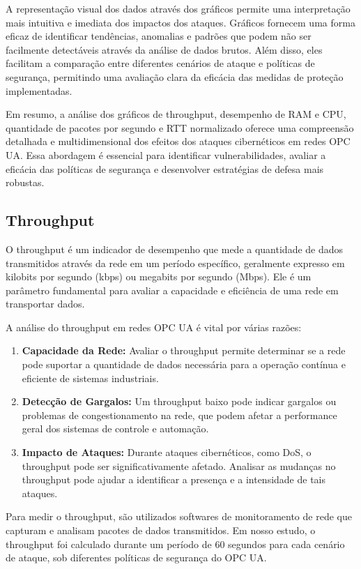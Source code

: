 {{    A representação visual dos dados através dos gráficos permite uma interpretação mais intuitiva e imediata dos impactos dos ataques. Gráficos fornecem uma forma eficaz de identificar tendências, anomalias e padrões que podem não ser facilmente detectáveis através da análise de dados brutos. Além disso, eles facilitam a comparação entre diferentes cenários de ataque e políticas de segurança, permitindo uma avaliação clara da eficácia das medidas de proteção implementadas.

    Em resumo, a análise dos gráficos de throughput, desempenho de RAM e CPU, quantidade de pacotes por segundo e RTT normalizado oferece uma compreensão detalhada e multidimensional dos efeitos dos ataques cibernéticos em redes OPC UA. Essa abordagem é essencial para identificar vulnerabilidades, avaliar a eficácia das políticas de segurança e desenvolver estratégias de defesa mais robustas.}
    
    \subsection{Throughput}

    O throughput é um indicador de desempenho que mede a quantidade de dados transmitidos através da rede em um período específico, geralmente expresso em kilobits por segundo (kbps) ou megabits por segundo (Mbps). Ele é um parâmetro fundamental para avaliar a capacidade e eficiência de uma rede em transportar dados.

    A análise do throughput em redes OPC UA é vital por várias razões:

    \begin{enumerate}
        \item \textbf{Capacidade da Rede:} Avaliar o throughput permite determinar se a rede pode suportar a quantidade de dados necessária para a operação contínua e eficiente de sistemas industriais.
        \item \textbf{Detecção de Gargalos:} Um throughput baixo pode indicar gargalos ou problemas de congestionamento na rede, que podem afetar a performance geral dos sistemas de controle e automação.
        \item \textbf{Impacto de Ataques:} Durante ataques cibernéticos, como DoS, o throughput pode ser significativamente afetado. Analisar as mudanças no throughput pode ajudar a identificar a presença e a intensidade de tais ataques.
    \end{enumerate}

    Para medir o throughput, são utilizados softwares de monitoramento de rede que capturam e analisam pacotes de dados transmitidos. Em nosso estudo, o throughput foi calculado durante um período de 60 segundos para cada cenário de ataque, sob diferentes políticas de segurança do OPC UA.

}
